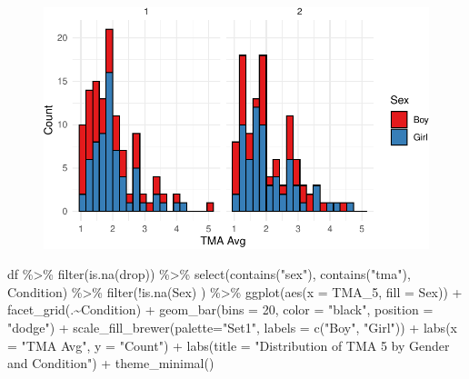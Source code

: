 \documentclass[
  letterpaper,
  DIV=11,
  numbers=noendperiod]{scrartcl}
\newenvironment{Shaded}{\begin{snugshade}}{\end{snugshade}}
\newcommand{\AttributeTok}[1]{\textcolor[rgb]{0.40,0.45,0.13}{#1}}
\newcommand{\DecValTok}[1]{\textcolor[rgb]{0.68,0.00,0.00}{#1}}
\newcommand{\FunctionTok}[1]{\textcolor[rgb]{0.28,0.35,0.67}{#1}}
\newcommand{\NormalTok}[1]{\textcolor[rgb]{0.00,0.23,0.31}{#1}}
\newcommand{\SpecialCharTok}[1]{\textcolor[rgb]{0.37,0.37,0.37}{#1}}
\newcommand{\StringTok}[1]{\textcolor[rgb]{0.13,0.47,0.30}{#1}}
\begin{document}
\begin{figure}[H]

{\centering \includegraphics{mathAnx_eda1_files/figure-pdf/unnamed-chunk-4-1.pdf}

}

\end{figure}

\begin{Shaded}
\begin{Highlighting}[]
\NormalTok{df }\SpecialCharTok{\%\textgreater{}\%}  \FunctionTok{filter}\NormalTok{(}\FunctionTok{is.na}\NormalTok{(drop)) }\SpecialCharTok{\%\textgreater{}\%} 
  \FunctionTok{select}\NormalTok{(}\FunctionTok{contains}\NormalTok{(}\StringTok{"sex"}\NormalTok{), }\FunctionTok{contains}\NormalTok{(}\StringTok{"tma"}\NormalTok{), Condition) }\SpecialCharTok{\%\textgreater{}\%} 
  \FunctionTok{filter}\NormalTok{(}\SpecialCharTok{!}\FunctionTok{is.na}\NormalTok{(Sex) ) }\SpecialCharTok{\%\textgreater{}\%} 
  \FunctionTok{ggplot}\NormalTok{(}\FunctionTok{aes}\NormalTok{(}\AttributeTok{x =}\NormalTok{ TMA\_5, }\AttributeTok{fill =}\NormalTok{ Sex)) }\SpecialCharTok{+}
  \FunctionTok{facet\_grid}\NormalTok{(.}\SpecialCharTok{\textasciitilde{}}\NormalTok{Condition) }\SpecialCharTok{+}
  \FunctionTok{geom\_bar}\NormalTok{(}\AttributeTok{bins =} \DecValTok{20}\NormalTok{, }\AttributeTok{color =} \StringTok{"black"}\NormalTok{,}
           \AttributeTok{position =} \StringTok{"dodge"}\NormalTok{) }\SpecialCharTok{+}
  \FunctionTok{scale\_fill\_brewer}\NormalTok{(}\AttributeTok{palette=}\StringTok{"Set1"}\NormalTok{, }\AttributeTok{labels =} 
                      \FunctionTok{c}\NormalTok{(}\StringTok{"Boy"}\NormalTok{, }\StringTok{"Girl"}\NormalTok{)) }\SpecialCharTok{+}
  \FunctionTok{labs}\NormalTok{(}\AttributeTok{x =} \StringTok{"TMA Avg"}\NormalTok{, }\AttributeTok{y =} \StringTok{"Count"}\NormalTok{) }\SpecialCharTok{+}
  \FunctionTok{labs}\NormalTok{(}\AttributeTok{title =} \StringTok{"Distribution of TMA 5 by Gender and Condition"}\NormalTok{) }\SpecialCharTok{+}
  \FunctionTok{theme\_minimal}\NormalTok{() }
\end{Highlighting}
\end{Shaded}
\end{document}
